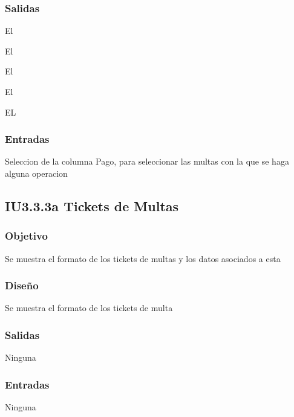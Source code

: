 \subsubsection{Salidas}
	\begin{Citemize}
		\item El 
		\item El 
		\item El 
		\item El 
		\item EL 
	\end{Citemize}
	
\subsubsection{Entradas}
	\begin{Citemize}
		\item Seleccion de la columna Pago, para seleccionar las multas con la que se haga alguna operacion
	\end{Citemize}

\newpage
\subsection{IU3.3.3a Tickets de Multas}

\subsubsection{Objetivo}
	Se muestra el formato de los tickets de multas y los datos asociados a esta 

\subsubsection{Diseño}
	Se muestra el formato de los tickets de multa


\subsubsection{Salidas}
	\begin{Citemize}
		\item Ninguna
	\end{Citemize}
	
\subsubsection{Entradas}
	\begin{Citemize}
		\item Ninguna
	\end{Citemize}